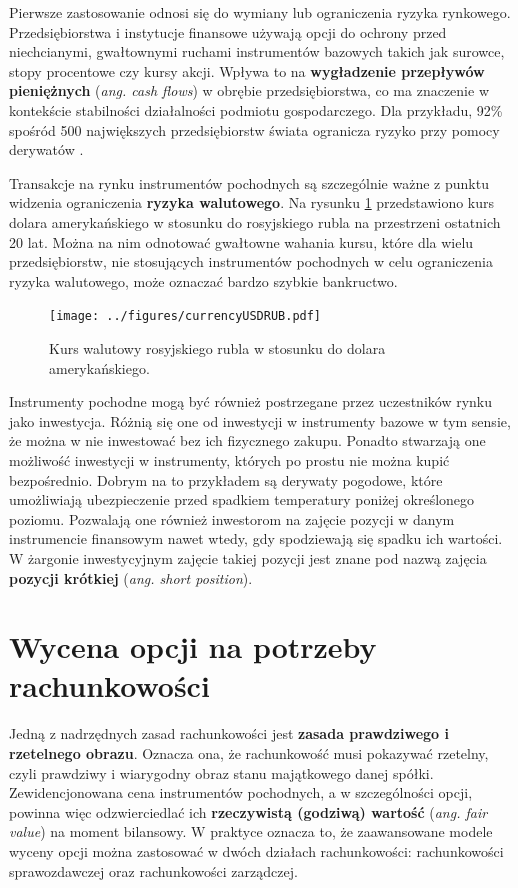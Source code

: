 \documentclass{pracamgr}
\begin{document}
Pierwsze zastosowanie odnosi się do wymiany lub ograniczenia ryzyka rynkowego. Przedsiębiorstwa i 
instytucje finansowe używają opcji do 
ochrony przed niechcianymi, gwałtownymi ruchami instrumentów bazowych takich jak surowce, stopy 
procentowe czy kursy akcji. Wpływa to na 
\textbf{wygładzenie przepływów pieniężnych} (\textit{ang. cash flows}) w obrębie przedsiębiorstwa, co 
ma znaczenie w kontekście stabilności działalności 
podmiotu gospodarczego. Dla przykładu, 92\% spośród 500 największych przedsiębiorstw świata ogranicza 
ryzyko przy pomocy derywatów  \cite{GlobalDerMarket}.


Transakcje na rynku instrumentów pochodnych są szczególnie ważne z punktu widzenia 
ograniczenia \textbf{ryzyka walutowego}. Na rysunku \ref{fig:currencyRisk} przedstawiono kurs dolara 
amerykańskiego w stosunku do rosyjskiego rubla na przestrzeni ostatnich 20 lat.
Można na nim odnotować gwałtowne wahania kursu, które dla wielu przedsiębiorstw, nie stosujących 
instrumentów pochodnych w celu ograniczenia ryzyka walutowego, może oznaczać bardzo szybkie 
bankructwo. 
\begin{figure}
  \centering  
  \texttt{[image: ../figures/currencyUSDRUB.pdf]}
  \caption{Kurs walutowy rosyjskiego rubla w stosunku do dolara amerykańskiego.}\label{fig:currencyRisk}
\end{figure} 
 
Instrumenty pochodne mogą być również postrzegane przez uczestników rynku jako inwestycja. 
Różnią się one od inwestycji w instrumenty bazowe w tym sensie, że można w nie inwestować bez ich 
fizycznego zakupu.
Ponadto stwarzają one możliwość inwestycji w instrumenty, których po prostu nie można kupić 
bezpośrednio. Dobrym na to przykładem są derywaty pogodowe, które umożliwiają ubezpieczenie przed 
spadkiem temperatury poniżej określonego poziomu.
Pozwalają one również inwestorom na zajęcie pozycji w danym instrumencie finansowym nawet wtedy, gdy 
spodziewają się spadku ich wartości. W żargonie inwestycyjnym zajęcie takiej pozycji jest znane pod 
nazwą zajęcia \textbf{pozycji krótkiej} (\textit{ang. short position}).


\section{Wycena opcji na potrzeby rachunkowości}
\label{sec:aspekty_finansowe}

Jedną z nadrzędnych zasad rachunkowości jest \textbf{zasada prawdziwego i rzetelnego obrazu}. Oznacza 
ona, że rachunkowość musi pokazywać rzetelny, czyli prawdziwy i wiarygodny
obraz stanu majątkowego danej spółki. Zewidencjonowana cena instrumentów pochodnych, a w 
szczególności opcji, powinna więc odzwierciedlać ich \textbf{rzeczywistą 
(godziwą) wartość} (\textit{ang. fair value}) na moment bilansowy. W praktyce oznacza to, że 
zaawansowane modele wyceny opcji można zastosować w dwóch działach rachunkowości: rachunkowości 
sprawozdawczej oraz rachunkowości zarządczej.
\end{document}
